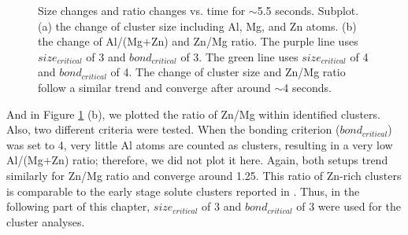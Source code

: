 \begingroup
\begin{figure}[!ht]
  \centering
\caption[Size changes and ratio changes vs. time for $\sim$5.5 seconds. ]{Size changes and ratio changes vs. time for $\sim$5.5 seconds. Subplot. (a) the change of cluster size including Al, Mg, and Zn atoms. (b) the change of Al/(Mg+Zn) and Zn/Mg ratio. The purple line uses $size_{critical}$ of 3 and $bond_{critical}$ of 3. The green line uses $size_{critical}$ of 4 and $bond_{critical}$ of 4. The change of cluster size and Zn/Mg ratio follow a similar trend and converge after around $\sim$4 seconds.}
\label{Chap:Al/Vac:fig:Al_Mg_Zn_benchmark}
\end{figure}
\endgroup


And in Figure \ref{Chap:Al/Vac:fig:Al_Mg_Zn_benchmark} (b), we plotted the ratio of Zn/Mg within identified clusters. Also, two different criteria were tested. When the bonding criterion ($bond_{critical}$) was set to 4, very little Al atoms are counted as clusters, resulting in a very low Al/(Mg+Zn) ratio; therefore, we did not plot it here. Again, both setups trend similarly for Zn/Mg ratio and converge around 1.25. This ratio of Zn-rich clusters is comparable to the early stage solute clusters reported in \cite{liu2020formation}. Thus, in the following part of this chapter, $size_{critical}$ of 3 and $bond_{critical}$ of 3 were used for the cluster analyses. 


